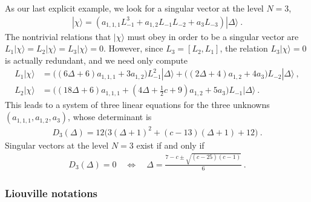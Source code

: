 \documentclass[12pt, a4paper, notitlepage, twoside]{report}
\numberwithin{equation}{section}
\theoremstyle{break}
\begin{document}
As our last explicit example, we look for a singular vector at the level $N=3$,
\begin{align}
 |\chi\rangle = \left(a_{1,1,1} L_{-1}^3 + a_{1,2}L_{-1}L_{-2} + a_3 L_{-3}\right) |\Delta\rangle\ .
\end{align}
The nontrivial relations that $|\chi\rangle$ must obey in order to be a singular vector are $L_1|\chi\rangle =L_2|\chi\rangle= L_3 |\chi\rangle=0$.
However, since $L_3 = [L_2,L_1]$, the relation $L_3|\chi\rangle=0$ is actually redundant, and we need only compute
\begin{align}
 L_1|\chi\rangle &= \Big((6\Delta+6)a_{1,1,1}+3a_{1,2}\Big)L_{-1}^2|\Delta\rangle +\Big((2\Delta+4)a_{1,2}+4a_3\Big)L_{-2}|\Delta\rangle\ ,
\\
L_2|\chi\rangle &= \Big((18\Delta+6)a_{1,1,1}+(4\Delta+\tfrac12c +9)a_{1,2}+5a_3\Big)L_{-1}|\Delta\rangle\ .
\end{align}
This leads to a system of three linear equations for the three unknowns $(a_{1,1,1},a_{1,2},a_3)$, whose determinant is
\begin{align}
 D_3(\Delta) = 12\Big(3(\Delta+1)^2+(c-13)(\Delta+1)+12\Big)\ .
\end{align}
Singular vectors at the level $N=3$ exist if and only if 
\begin{align}
 D_3(\Delta) = 0 \quad \iff \quad \Delta = \frac{7-c\pm\sqrt{(c-25)(c-1)}}{6}\ .
\end{align}

\subsubsection{Liouville notations}
\end{document}
